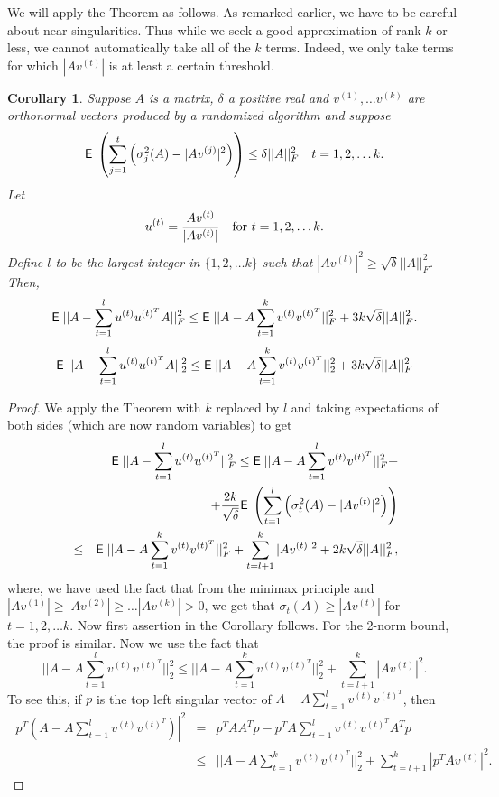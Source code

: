 \documentclass{book}
\newtheorem{corollary}[theorem]{Corollary}
\numberwithin{exercise}{chapter}
\begin{document}
We will apply the Theorem as follows. As remarked earlier, we have to be careful about near singularities. Thus while we seek a good approximation of rank $k$ or less, we cannot automatically take all of the $k$ terms. Indeed, we only take terms for which $|Av^{(t)}|$ is at least a certain threshold.

\begin{corollary}\label{invariant4}
Suppose $A$ is a matrix, $\delta$ a positive real and $v^{(1)},\ldots v^{(k)}$ are orthonormal vectors produced
by a randomized algorithm and suppose
$$\hbox{{\sf E}\;}\left(\sum_{j=1}^t\left( \sigma_j^2(A)-|Av^{(j)}|^2\right)\right)\leq\delta ||A||_F^2\quad
t=1,2,\ldots k.$$
Let
$$u^{(t)} = {Av^{(t)}\over |Av^{(t)}|}\quad\hbox{for } t=1,2,\ldots k.$$
Define $l$ to be the largest integer in $\{ 1,2,\ldots k\}$ such that
$|Av^{(l)}|^2\geq \sqrt\delta ||A||_F^2$. Then,
$$\hbox{{\sf E}\;}||A-\sum_{t=1}^lu^{(t)}u^{(t)^T}A||_F^2\leq \hbox{{\sf E}\;}||A-A\sum_{t=1}^kv^{(t)}v^{(t)^T}||_F^2+
3 k\sqrt\delta||A||_F^2.$$
$$\hbox{{\sf E}\;}||A-\sum_{t=1}^lu^{(t)}u^{(t)^T}A||_2^2\leq \hbox{{\sf E}\;}||A-A\sum_{t=1}^kv^{(t)}v^{(t)^T}||_2^2+
3 k\sqrt\delta||A||_F^2$$
       \end{corollary}
\begin{proof}
We apply the Theorem with $k$ replaced by $l$ and taking expectations of both sides (which are now random
variables) to get
\begin{eqnarray*}
&&\hbox{{\sf E}\;}||A-\sum_{t=1}^lu^{(t)}u^{(t)^T}||_F^2\leq \hbox{{\sf E}\;}||A-A\sum_{t=1}^lv^{(t)}v^{(t)^T}||_F^2+\\
&&+{2k\over\sqrt\delta}
\hbox{{\sf E}\;}\left( \sum_{t=1}^l\left( \sigma_t^2(A)-|Av^{(t)}|^2\right)\right)\\
&\leq& \hbox{{\sf E}\;}||A-A\sum_{t=1}^kv^{(t)}v^{(t)^T}||_F^2+\sum_{t=l+1}^k|Av^{(t)}|^2+2k\sqrt\delta||A||_F^2,
\end{eqnarray*}
where, we have used the fact that from the minimax principle and
$|Av^{(1)}|\geq |Av^{(2)}|\geq\ldots |Av^{(k)}|>0$, we get that
$\sigma_t(A)\geq |Av^{(t)}|$ for $t=1,2,\ldots k$. Now first assertion in the Corollary follows.
For the 2-norm bound, the proof is similar. Now we use the fact that
$$||A-A\sum_{t=1}^lv^{(t)}v^{(t)^T}||_2^2\leq ||A-A\sum_{t=1}^kv^{(t)}v^{(t)^T}||_2^2+\sum_{t=l+1}^k|Av^{(t)}|^2.$$
To see this, if $p$ is the top left singular vector of $A-A\sum_{t=1}^lv^{(t)}v^{(t)^T}$, then
\begin{eqnarray*}
|p^T(A-A\sum_{t=1}^lv^{(t)}v^{(t)^T})|^2 &=& p^TAA^Tp-p^TA\sum_{t=1}^lv^{(t)}v^{(t)^T}A^Tp\\
&\leq&
||A-A\sum_{t=1}^kv^{(t)}v^{(t)^T}||_2^2+\sum_{t=l+1}^k|p^TAv^{(t)}|^2.
\end{eqnarray*}


\end{proof}
\end{document}
